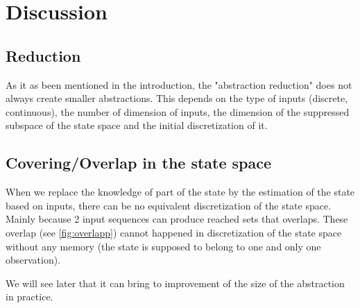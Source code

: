 \section{Discussion}

\subsection{Reduction}
As it as been mentioned in the introduction, the "abstraction reduction" does not always create smaller abstractions.
This depends on the type of inputs (discrete, continuous), the number of dimension of inputs, the dimension of the suppressed subspace of the state space and the initial discretization of it.

\subsection{Covering/Overlap in the state space}
When we replace the knowledge of part of the state by the estimation of the state based on inputs, there can be no equivalent discretization of the state space.
Mainly because 2 input sequences can produce reached sets that overlaps.
These overlap (see \ref{fig:overlapp}) cannot happened in discretization of the state space without any memory (the state is supposed to belong to one and only one observation).

We will see later that it can bring to improvement of the size of the abstraction in practice.


